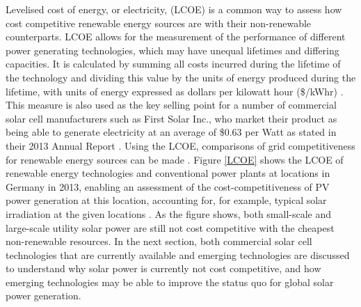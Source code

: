 \documentclass[11pt, twoside]{report}
\begin{document}
Levelised cost of energy, or electricity, (LCOE) is a common way to assess how cost competitive renewable energy sources are with their non-renewable counterparts. LCOE allows for the measurement of the performance of different power generating technologies, which may have unequal lifetimes and differing capacities. It is calculated by summing all costs incurred during the lifetime of the technology and dividing this value by the units of energy produced during the lifetime, with units of energy expressed as dollars per kilowatt hour (\$/kWhr) \cite{LCOE2}. This measure is also used as the key selling point for a number of commercial solar cell manufacturers such as First Solar Inc., who market their product as being able to generate electricity at an average of \$0.63 per Watt as stated in their 2013  Annual Report \cite{first_solar}. Using the LCOE, comparisons of grid competitiveness for renewable energy sources can be made \cite{LCOE2}. Figure \ref{LCOE} shows the LCOE of renewable energy technologies and conventional power plants at locations in Germany in 2013, enabling an assessment of the cost-competitiveness of PV power generation at this location, accounting for, for example, typical solar irradiation at the given locations \cite{LCOE}. As the figure shows, both small-scale and large-scale utility solar power are still not cost competitive with the cheapest non-renewable resources. In the next section, both commercial solar cell technologies that are currently available and emerging technologies are discussed to understand why solar power is currently not cost competitive, and how emerging technologies may be able to improve the status quo for global solar power generation.


\end{document}
